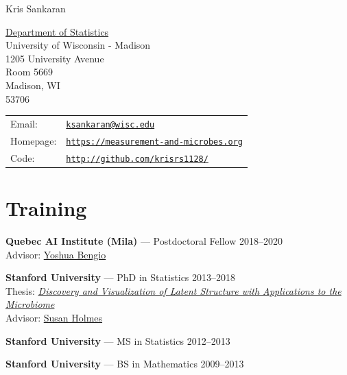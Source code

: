 \documentclass[letterpaper]{article}
\def\name{Kris Sankaran}
\renewenvironment{itemize}{
  \begin{list}{}{
    \setlength{\leftmargin}{1.5em}
  }
}{
  \end{list}
}
\begin{document}
{\huge \name}


\vspace{0.25in}

\begin{minipage}{0.45\linewidth}
  \href{https://stat.wisc.edu/}{Department of Statistics} \\
  University of Wisconsin - Madison \\
  1205 University Avenue \\
  Room 5669 \\
  Madison, WI \\
  53706
\end{minipage}
\begin{minipage}{0.45\linewidth}
  \begin{tabular}{ll}
    Email: & \href{mailto:ksankaran@wisc.edu}{\tt ksankaran@wisc.edu} \\
    Homepage: & \href{https://measurement-and-microbes.org}{\tt https://measurement-and-microbes.org} \\
    Code: & \href{http://github.com/krisrs1128/}{\tt http://github.com/krisrs1128/} \\
  \end{tabular}
\end{minipage}

\section*{Training}

\begin{itemize}
    \item \textbf{Quebec AI Institute (Mila)} — Postdoctoral Fellow \hfill 2018–2020 \\
          Advisor: \href{https://mila.quebec/en/directory/yoshua-bengio}{Yoshua Bengio}
    \item \textbf{Stanford University} — PhD in Statistics \hfill 2013–2018 \\
          Thesis: \textit{\href{https://searchworks.stanford.edu/view/12375828}{Discovery and Visualization of Latent Structure with Applications to the Microbiome}} \\
          Advisor: \href{https://susan.su.domains/}{Susan Holmes}
    \item \textbf{Stanford University} — MS in Statistics \hfill 2012–2013
    \item \textbf{Stanford University} — BS in Mathematics \hfill 2009–2013
\end{itemize}
\end{document}
